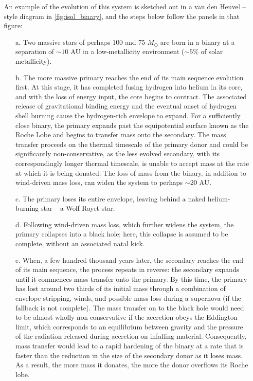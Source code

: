 \documentclass[review]{elsarticle}
\begin{document}
An example of the evolution of this system is sketched out in a van den Heuvel -- style diagram in \autoref{fig:isol_binary}, and the steps below follow the panels in that figure:
\begin{enumerate}  
\item[a.] Two massive stars of perhaps $100$ and $75$ $M_{\odot}$ are born in a binary at a separation of $\sim 10$ AU in a low-metallicity environment ($\sim 5\%$ of solar metallicity).  
\item[b.] The more massive primary reaches the end of its main sequence evolution first.  At this stage, it has completed fusing hydrogen into helium in its core, and with the loss of energy input, the core begins to contract.  The associated release of gravitational binding energy and the eventual onset of hydrogen shell burning cause the hydrogen-rich envelope to expand.  For a sufficiently close binary, the primary expands past the equipotential surface known as the Roche Lobe and begins to transfer mass onto the secondary.  The mass transfer proceeds on the thermal timescale of the primary donor and could be significantly non-conservative, as the less evolved secondary, with its correspondingly longer thermal timescale, is unable to accept mass at the rate at which it is being donated.  The loss of mass from the binary, in addition to wind-driven mass loss, can widen the system to perhaps $\sim 20$ AU.  
\item[c.] The primary loses its entire envelope, leaving behind a naked helium-burning star -- a Wolf-Rayet star.  
\item[d.] Following wind-driven mass loss, which further widens the system, the primary collapses into a black hole; here, this collapse is assumed to be complete, without an associated natal kick.  
\item[e.] When, a few hundred thousand years later, the secondary reaches the end of its main sequence, the process repeats in reverse: the secondary expands until it commences mass transfer onto the primary.  By this time, the primary has lost around two thirds of its initial mass through a combination of envelope stripping, winds, and possible mass loss during a supernova (if the fallback is not complete).  The mass transfer on to the black hole would need to be almost wholly non-conservative if the accretion obeys the Eddington limit, which corresponds to an equilibrium between gravity and the pressure of the radiation released during accretion on infalling material.  Consequently, mass transfer would lead to a rapid hardening of the binary at a rate that is faster than the reduction in the size of the secondary donor as it loses mass.  As a result, the more mass it donates, the more the donor overflows its Roche lobe.  

\end{enumerate}
\end{document}
